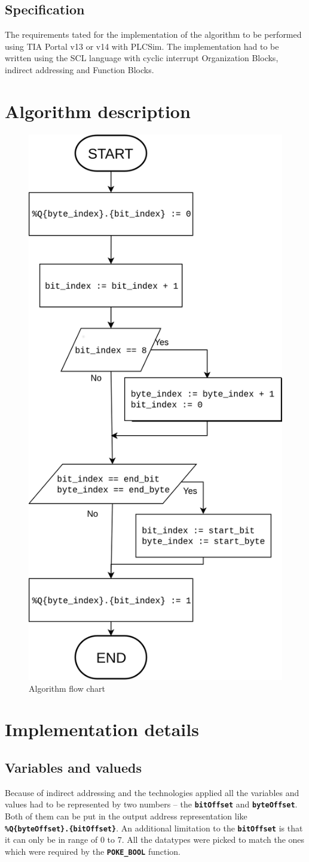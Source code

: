 \documentclass[a4paper, 12pt, titlepage]{article}
\begin{document}
        \subsection{Specification}
            The requirements tated for the implementation of the algorithm to be
            performed using TIA Portal v13 or v14 with PLCSim. The implementation 
            had to be written using the SCL language with cyclic interrupt Organization
            Blocks, indirect addressing and Function Blocks.
    \section{Algorithm description}
        \begin{figure}[H]
            \centering
            \includegraphics[width=0.5\linewidth]{algo.png}
            \caption{Algorithm flow chart}
        \end{figure}
    \section{Implementation details}
        \subsection{Variables and valueds}
            Because of indirect addressing and the technologies applied all
            the variables and values had to be represented by two numbers --
            the \textbf{\texttt{bitOffset}} and \textbf{\texttt{byteOffset}}.
            Both of them can be put in the output address representation like \linebreak 
            \textbf{\texttt{\%Q\{byteOffset\}.\{bitOffset\}}}. An additional 
            limitation to the \textbf{\texttt{bitOffset}} is that it can only
            be in range of 0 to 7. All the datatypes were picked to match the 
            ones which were required by the \texttt{\textbf{POKE\_BOOL}} function.
\end{document}
